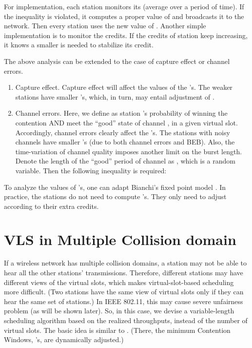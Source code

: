\documentclass[letterpaper, 10 pt, conference]{ieeeconf}
\begin{document}
For implementation, each station monitors its  (average
over a period of time). If the inequality is violated, it computes
a proper value of  and broadcasts it to the network. Then every station
uses the new value of . Another simple implementation
is to monitor the credits. If the credits of station  keep increasing,
it knows a smaller  is needed to stabilize its credit.

The above analysis can be extended to the case of capture effect or
channel errors.

\begin{enumerate}
\item Capture effect. Capture effect will affect the values of the 's. The weaker
stations have smaller 's, which, in turn, may entail adjustment
of .
\item Channel errors. Here, we define  as station 's probability
of winning the contention AND meet the {}``good'' state of channel
, in a given virtual slot. Accordingly, channel errors clearly affect the 's.
The stations with noisy channels have smaller 's (due to both
channel errors and BEB). Also, the time-variation of channel quality
imposes another limit on the burst length. Denote the length of the
{}``good'' period of channel  as , which is a random
variable. Then the following inequality is required:

\end{enumerate}
To analyze the values of 's, one can adapt Bianchi's fixed
point model \cite{Bianchi}. In practice, the stations do not need
to compute 's. They only need to adjust  according to
their extra credits.





\section{\label{sec:VLS-in-Multiple-CD}VLS in Multiple Collision domain}

If a wireless network has multiple collision domains, a station may
not be able to hear all the other stations' transmissions. Therefore,
different stations may have different views of the virtual slots, 
which makes virtual-slot-based scheduling more difficult. (Two
stations have the same view of virtual slots only if they can hear
the same set of stations.) In IEEE 802.11, this may cause severe unfairness problem 
(as will be shown later). So, in this case, we devise a variable-length
scheduling algorithm based on the realized throughputs, instead of
the number of virtual slots. The basic idea is similar to \cite{fair_by_observation}\cite{Gupta_fairness}.
(There, the minimum Contention Windows, 's, are dynamically adjusted.)
\end{document}
